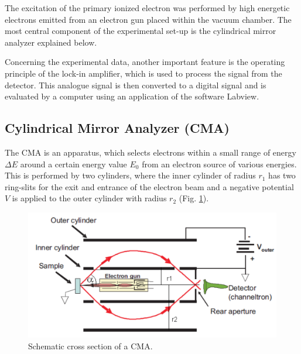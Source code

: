 \documentclass[a4paper]{scrartcl}
\numberwithin{equation}{section}
\numberwithin{figure}{section}
\numberwithin{table}{section}
\begin{document}
The excitation of the primary ionized electron was performed by high energetic electrons emitted from an electron gun placed within the vacuum chamber. The most central component of the experimental set-up is the cylindrical mirror analyzer explained below. 

Concerning the experimental data, another important feature is the operating principle of the lock-in amplifier, which is used to process the signal from the detector. This analogue signal is then converted to a digital signal and is evaluated by a computer using an application of the software Labview.
\subsection{Cylindrical Mirror Analyzer (CMA)}
The CMA is an apparatus, which selects electrons within a small range of energy $\Delta E$ around a certain energy value $E_0$ from an electron source of various energies. This is performed by two cylinders, where the inner cylinder of radius $r_1$ has two ring-slits for the exit and entrance of the electron beam and a negative potential $V$ is applied to the outer cylinder with radius $r_2$ (Fig. \ref{cma}). 

\begin{figure}[htbp]
\centering
\includegraphics[width=0.6 \textwidth]{cma.pdf}
\caption{\small Schematic cross section of a CMA. \cite{skript}}
\label{cma}
\end{figure}
\end{document}
